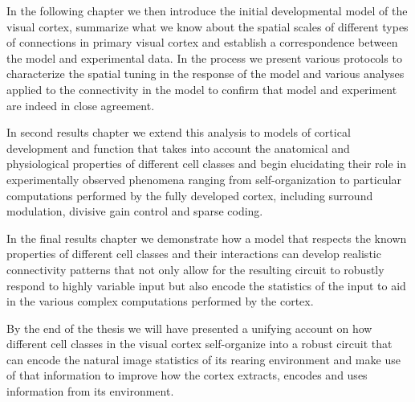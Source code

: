 In the following chapter we then introduce the initial developmental
model of the visual cortex, summarize what we know about the spatial
scales of different types of connections in primary visual cortex and
establish a correspondence between the model and experimental data. In
the process we present various protocols to characterize the spatial
tuning in the response of the model and various analyses applied to
the connectivity in the model to confirm that model and experiment are
indeed in close agreement.

In second results chapter we extend this analysis to models of
cortical development and function that takes into account the
anatomical and physiological properties of different cell classes and
begin elucidating their role in experimentally observed phenomena
ranging from self-organization to particular computations performed by
the fully developed cortex, including surround modulation, divisive
gain control and sparse coding.

In the final results chapter we demonstrate how a model that respects
the known properties of different cell classes and their interactions
can develop realistic connectivity patterns that not only allow for
the resulting circuit to robustly respond to highly variable input but
also encode the statistics of the input to aid in the various complex
computations performed by the cortex.

By the end of the thesis we will have presented a unifying account on
how different cell classes in the visual cortex self-organize into a
robust circuit that can encode the natural image statistics of its
rearing environment and make use of that information to improve how
the cortex extracts, encodes and uses information from its
environment.
